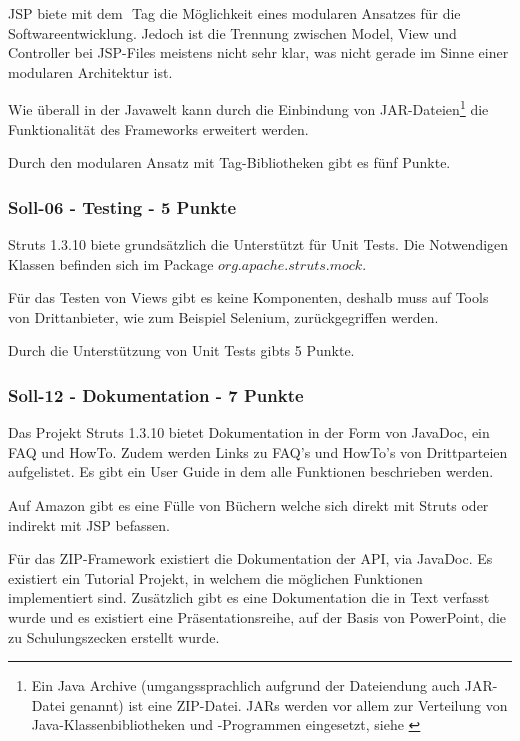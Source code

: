   \ac{JSP} biete mit dem \(<jsp:include>\) Tag die Möglichkeit eines modularen
  Ansatzes für die Softwareentwicklung. Jedoch ist die Trennung zwischen Model,
  View und Controller bei JSP-Files meistens nicht sehr klar, was nicht gerade
  im Sinne einer modularen Architektur ist.
  
  Wie überall in der Javawelt kann durch die Einbindung von
  JAR-Dateien\footnote{Ein Java Archive (umgangssprachlich aufgrund der
  Dateiendung auch JAR-Datei genannt) ist eine ZIP-Datei. JARs werden vor allem
  zur Verteilung von Java-Klassenbibliotheken und -Programmen eingesetzt, siehe
  \cite{JARDatei}} die Funktionalität des Frameworks erweitert werden.
  
  Durch den modularen Ansatz mit Tag-Bibliotheken gibt es fünf Punkte.
  
  \subsubsection{Soll-06 - Testing - 5 Punkte}
  
  Struts 1.3.10 biete grundsätzlich die Unterstützt für Unit Tests. Die
  Notwendigen Klassen befinden sich im Package \(org.apache.struts.mock\).
  
  Für das Testen von Views gibt es keine Komponenten, deshalb muss auf Tools
  von Drittanbieter, wie zum Beispiel Selenium, zurückgegriffen werden.
  
  Durch die Unterstützung von Unit Tests gibts 5 Punkte.
  
  \subsubsection{Soll-12 - Dokumentation - 7 Punkte}
  
  Das Projekt Struts 1.3.10 bietet Dokumentation in der Form von JavaDoc, ein
  FAQ und HowTo. Zudem werden Links zu FAQ's und HowTo's von Drittparteien
  aufgelistet. Es gibt ein User Guide in dem alle Funktionen beschrieben werden.
  
  Auf Amazon gibt es eine Fülle von Büchern welche sich direkt mit Struts oder
  indirekt mit \ac{JSP} befassen.
  
  Für das \ac{ZIP}-Framework existiert die Dokumentation der API, via JavaDoc.
  Es existiert ein Tutorial Projekt, in welchem die möglichen Funktionen
  implementiert sind. Zusätzlich gibt es eine Dokumentation die in Text
  verfasst wurde und es existiert eine Präsentationsreihe, auf der Basis von
  PowerPoint, die zu Schulungszecken erstellt wurde.
  
